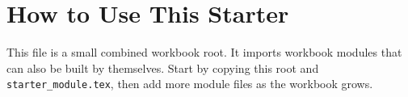 \documentclass{otscience}
\begin{document}
\maketitle
\tableofcontents
\newpage

\section*{How to Use This Starter}

This file is a small combined workbook root. It imports workbook modules that
can also be built by themselves. Start by copying this root and
\texttt{starter\_module.tex}, then add more module files as the workbook grows.


\end{document}
